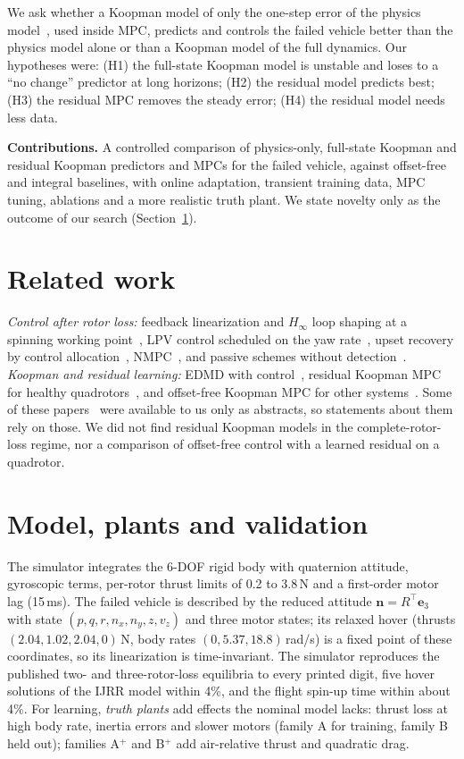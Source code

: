 \documentclass[journal]{IEEEtran}
\newcommand{\vect}[1]{\boldsymbol{#1}}
\begin{document}
We ask whether a Koopman model of only the one-step error of the physics model~\cite{williams2015edmd,korda2018linear,todde2026residual}, used inside MPC, predicts and controls the failed vehicle better than the physics model alone or than a Koopman model of the full dynamics. Our hypotheses were: (H1) the full-state Koopman model is unstable and loses to a ``no change'' predictor at long horizons; (H2) the residual model predicts best; (H3) the residual MPC removes the steady error; (H4) the residual model needs less data.

\textbf{Contributions.} A controlled comparison of physics-only, full-state Koopman and residual Koopman predictors and MPCs for the failed vehicle, against offset-free and integral baselines, with online adaptation, transient training data, MPC tuning, ablations and a more realistic truth plant. We state novelty only as the outcome of our search (Section~\ref{sec:related}).

\section{Related work}\label{sec:related}
\emph{Control after rotor loss:} feedback linearization and $H_\infty$ loop shaping at a spinning working point~\cite{freddi2011feedback,lanzon2014flight}, LPV control scheduled on the yaw rate~\cite{stephan2018lpv}, upset recovery by control allocation~\cite{sun2020upset}, NMPC~\cite{nan2022nmpc}, and passive schemes without detection~\cite{ke2023uniform}. \emph{Koopman and residual learning:} EDMD with control~\cite{korda2018linear}, residual Koopman MPC for healthy quadrotors~\cite{todde2026residual}, and offset-free Koopman MPC for other systems~\cite{schimperna2025offsetfree}. Some of these papers~\cite{stephan2018lpv,lanzon2014flight} were available to us only as abstracts, so statements about them rely on those. We did not find residual Koopman models in the complete-rotor-loss regime, nor a comparison of offset-free control with a learned residual on a quadrotor.

\section{Model, plants and validation}
The simulator integrates the 6-DOF rigid body with quaternion attitude, gyroscopic terms, per-rotor thrust limits of 0.2 to 3.8\,N and a first-order motor lag (15\,ms). The failed vehicle is described by the reduced attitude $\vect n = R^\top\vect e_3$ with state $(p,q,r,n_x,n_y,z,v_z)$ and three motor states; its relaxed hover (thrusts $(2.04, 1.02, 2.04, 0)$\,N, body rates $(0, 5.37, 18.8)$\,rad/s) is a fixed point of these coordinates, so its linearization is time-invariant. The simulator reproduces the published two- and three-rotor-loss equilibria to every printed digit, five hover solutions of the IJRR model within 4\%, and the flight spin-up time within about 4\%. For learning, \emph{truth plants} add effects the nominal model lacks: thrust loss at high body rate, inertia errors and slower motors (family A for training, family B held out); families A$^+$ and B$^+$ add air-relative thrust and quadratic drag.
\end{document}
